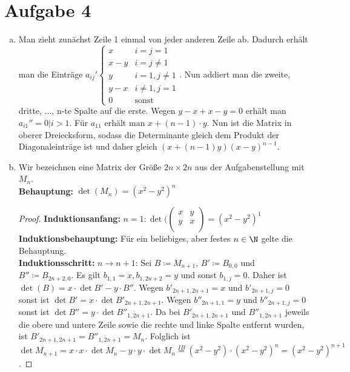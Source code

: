 \documentclass{article}
\begin{document}
\section*{Aufgabe 4}
\begin{enumerate}[(a)]
	\item Man zieht zunächst Zeile 1 einmal von jeder anderen Zeile ab. Dadurch erhält man die Einträge $a_{ij}'\begin{cases}
			      x   & i=j=1           \\
			      x-y & i = j \neq 1    \\
			      y   & i = 1, j \neq 1 \\
			      y-x & i \neq 1, j = 1 \\
			      0   & \text{sonst}
		      \end{cases}$.
	      Nun addiert man die zweite, dritte, $\dots$, n-te Spalte auf die erste. Wegen $y-x + x-y = 0$ erhält man $a_{i1}'' = 0 | i > 1$. Für $a_{11}$ erhält man $x + (n-1) \cdot y$. Nun ist die Matrix in oberer Dreiecksform, sodass die Determinante gleich dem Produkt der Diagonaleinträge ist und daher gleich $(x + (n-1)y) (x-y)^{n-1}$.
	\item Wir bezeichnen eine Matrix der Größe $2n \times 2n$ aus der Aufgabenstellung mit $M_n$. \\
	      \textbf{Behauptung:} \(\det(M_n) = (x^2 -y^2)^n\)
	      \begin{proof}
		      \textbf{Induktionsanfang:} \(n = 1: \det(\begin{pmatrix}
			      x & y \\
			      y & x \\
		      \end{pmatrix} = (x^2-y^2)^1\)\\
		      \textbf{Induktionsbehauptung:} Für ein beliebiges, aber festes \(n\in \N\) gelte die Behauptung.\\
		      \textbf{Induktionsschritt:} \(n \to n+1\):
		      Sei $B \coloneqq M_{n+1}$, $B' \coloneqq B_{0,0}$ und $B'' \coloneqq B_{2n+2,0}$.
		      Es gilt $b_{1,1} = x, b_{1,2n+2} = y$ und sonst $b_{1,j} = 0$. Daher ist $\det(B) = x \cdot \det B' - y \cdot B''$.
		      Wegen $b'_{2n+1,2n+1} = x$ und $b'_{2n+1,j} = 0$ sonst ist $\det B' = x \cdot \det B'_{2n+1, 2n+1}$.
		      Wegen $b''_{2n+1,1} = y$ und $b''_{2n+1,j} = 0$ sonst ist $\det B'' = y \cdot \det B''_{1, 2n+1}$.
		      Da bei $B'_{2n+1, 2n+1}$ und $B''_{1, 2n+1}$ jeweils die obere und untere Zeile sowie die rechte und linke Spalte entfernt wurden, ist $B'_{2n+1, 2n+1} = B''_{1, 2n+1} = M_n$.
		      Folglich ist $\det M_{n+1} = x \cdot x \cdot \det M_n - y\cdot y \cdot \det M_n \overset{IB}{=} (x^2 - y^2) \cdot (x^2 - y^2)^n = (x^2 - y^2)^{n+1}$.
	      \end{proof}

\end{enumerate}
\end{document}
